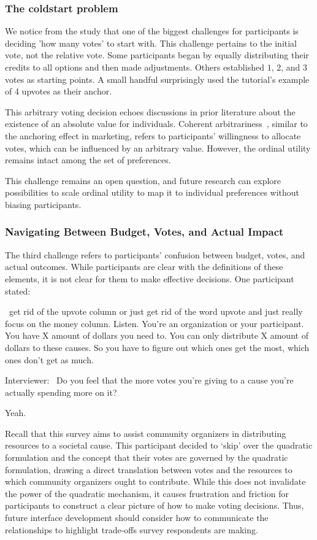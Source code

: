 \subsubsection{The coldstart problem}
We notice from the study that one of the biggest challenges for participants is deciding 'how many votes' to start with. This challenge pertains to the initial vote, not the relative vote. Some participants began by equally distributing their credits to all options and then made adjustments. Others established $1$, $2$, and $3$ votes as starting points. A small handful surprisingly used the tutorial's example of 4 upvotes as their anchor.

This arbitrary voting decision echoes discussions in prior literature about the existence of an absolute value for individuals. Coherent arbitrariness~\cite{arielyCoherentArbitrarinessStable2003}, similar to the anchoring effect in marketing, refers to participants' willingness to allocate votes, which can be influenced by an arbitrary value. However, the ordinal utility remains intact among the set of preferences.

This challenge remains an open question, and future research can explore possibilities to scale ordinal utility to map it to individual preferences without biasing participants.

\subsubsection{Navigating Between Budget, Votes, and Actual Impact}
The third challenge refers to participants' confusion between budget, votes, and actual outcomes. While participants are clear with the definitions of these elements, it is not clear for them to make effective decisions. One participant stated:

\begin{displayquote}

~\bracketellipsis get rid of the upvote column or just get rid of the word upvote and just really focus on the money column. Listen. You're an organization or your participant. You have X amount of dollars you need to. You can only distribute X amount of dollars to these causes. So you have to figure out which ones get the most, which ones don't get as much.~\bracketellipsis 

Interviewer: ~\bracketellipsis Do you feel that the more votes you're giving to a cause you're actually spending more on it?

Yeah. \hfill{}
\end{displayquote}
Recall that this survey aims to assist community organizers in distributing resources to a societal cause. This participant decided to `skip' over the quadratic formulation and the concept that their votes are governed by the quadratic formulation, drawing a direct translation between votes and the resources to which community organizers ought to contribute. While this does not invalidate the power of the quadratic mechanism, it causes frustration and friction for participants to construct a clear picture of how to make voting decisions. Thus, future interface development should consider how to communicate the relationships to highlight trade-offs survey respondents are making.

